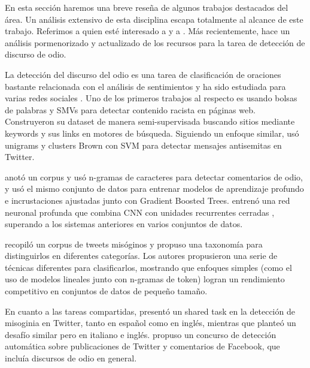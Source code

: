 En esta sección haremos una breve reseña de algunos trabajos destacados del área. Un análisis extensivo de esta disciplina escapa totalmente al alcance de este trabajo. Referimos a quien esté interesado a \citet{schmidt2017survey} y a \citet{fortuna2018survey}. Más recientemente, \citet{poletto2021resources} hace un análisis pormenorizado y actualizado de los recursos para la tarea de detección de discurso de odio.

La detección del discurso del odio es una tarea de clasificación de oraciones bastante relacionada con el análisis de sentimientos y ha sido estudiada para varias redes sociales \cite{thelwall2008social, pak2010twitter, saleem2017web}. Uno de los primeros trabajos al respecto es \citet{greevy2004classifying} usando bolsas de palabras y SMVs para detectar contenido racista en páginas web. Construyeron su dataset de manera semi-supervisada buscando sitios mediante keywords y sus links en motores de búsqueda. Siguiendo un enfoque similar, \citet{warner2012detecting} usó unigrams y clusters Brown con SVM para detectar mensajes antisemitas en Twitter.

\citet{waseem2016hateful} anotó un corpus y usó n-gramas de caracteres para detectar comentarios de odio, y \citet{badjatiya2017deep} usó el mismo conjunto de datos para entrenar modelos de aprendizaje profundo e incrustaciones ajustadas junto con Gradient Boosted Trees. \citet {zhang2018detecting} entrenó una red neuronal profunda que combina CNN con unidades recurrentes cerradas \cite{cho2014learning}, superando a los sistemas anteriores en varios conjuntos de datos.

\citet{anzovino2018automatic} recopiló un corpus de tweets misóginos y propuso una taxonomía para distinguirlos en diferentes categorías. Los autores propusieron una serie de técnicas diferentes para clasificarlos, mostrando que enfoques simples (como el uso de modelos lineales junto con n-gramas de token) logran un rendimiento competitivo en conjuntos de datos de pequeño tamaño.

En cuanto a las tareas compartidas, \citet{fersini2018overview} presentó un shared task en la detección de misoginia en Twitter, tanto en español como en inglés, mientras que \citet{fersini2018evalitaoverview} planteó un desafío similar pero en italiano e inglés. \citet{bosco2018overview} propuso un concurso de detección automática sobre publicaciones de Twitter y comentarios de Facebook, que incluía discursos de odio en general.



